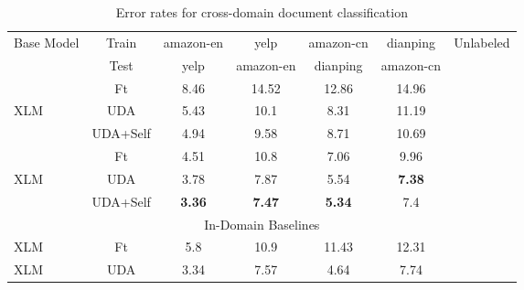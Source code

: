 \documentclass{article} \usepackage{iclr2020_conference,times}
\newcommand{\cmark}{\ding{51}}\newcommand{\xmark}{\ding{55}}\usepackage{hyperref}       \usepackage{url}            \usepackage{booktabs}       \usepackage[inline]{enumitem}
\begin{document}
\begin{table}[!ht]
\centering
    \begin{tabular}{l|c|cccc|c}
    \toprule
    Base Model & Train    & amazon-en & yelp     & amazon-cn & dianping  & Unlabeled \\
          & Test     & yelp     & amazon-en & dianping & amazon-cn  &\\
    \midrule
          & Ft       & 8.46     & 14.52    & 12.86    & 14.96    & \xmark \\
    XLM   & UDA      & 5.43     & 10.1     & 8.31     & 11.19    & \cmark \\
          & UDA+Self & 4.94     & 9.58     & 8.71     & 10.69    & \cmark \\
    \midrule
          & Ft       & 4.51     & 10.8     & 7.06     & 9.96     & \cmark \\
    XLM & UDA      & 3.78     & 7.87     & 5.54     & \textbf{7.38}     & \cmark \\
          & UDA+Self & \textbf{ 3.36}     & \textbf{7.47}     & \textbf{5.34}     & 7.4      & \cmark \\
    \midrule
    \midrule
    \multicolumn{7}{c}{In-Domain Baselines}  \\
    \midrule
    XLM & Ft & 5.8 & 10.9 & 11.43  & 12.31 & \xmark \\
    \midrule 
    XLM & UDA &  3.34 & 7.57 & 4.64 & 7.74 & \cmark \\ 
    \bottomrule
    \end{tabular}
    \caption{Error rates for cross-domain document classification}
    \label{tab:cross-domain}
\end{table} 
\end{document}
